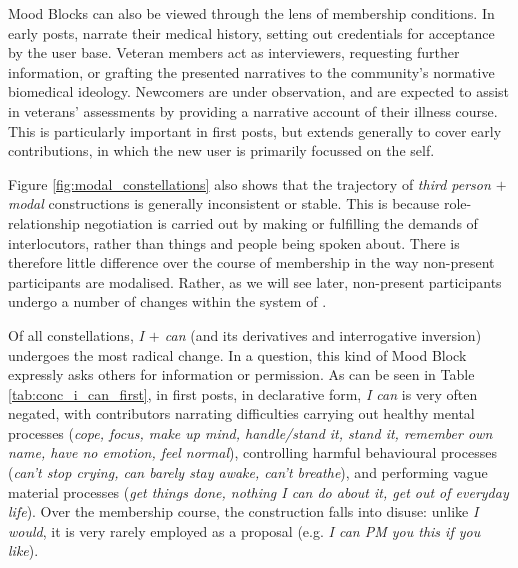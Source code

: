 Mood Blocks can also be viewed through the lens of  membership conditions. In early \glspl{post},  narrate their medical history, setting out credentials for acceptance by the user base. Veteran \glspl{member} act as interviewers, requesting further information, or grafting the presented narratives to the community's normative biomedical ideology. Newcomers are under observation, and are expected to assist in veterans' assessments by providing a narrative account of their illness course. This is particularly important in first \glspl{post}, but extends generally to cover early contributions, in which the new user is primarily focussed on the self.

Figure \ref{fig:modal_constellations} also shows that the trajectory of \emph{third person $+$ modal} constructions is generally inconsistent or stable. This is because role\hyp{}relationship negotiation is carried out by making or fulfilling the demands of interlocutors, rather than things and people being spoken about. There is therefore little difference over the course of membership in the way non\hyp{}present participants are modalised. Rather, as we will see later, non\hyp{}present participants undergo a number of changes within the system of .

Of all constellations, \emph{I $+$ can} (and its derivatives and interrogative inversion) undergoes the most radical change. In a question, this kind of Mood Block expressly asks others for information or permission. As can be seen in Table \ref{tab:conc_i_can_first}, in first \glspl{post}, in declarative form, \emph{I can} is very often negated, with contributors narrating difficulties carrying out healthy mental processes (\emph{cope, focus, make up mind, handle\slash stand it, stand it, remember own name, have no emotion, feel normal}), controlling harmful behavioural processes (\emph{can't stop crying, can barely stay awake, can't breathe}), and performing vague material processes (\emph{get things done, nothing I can do about it, get out of everyday life}). Over the membership course, the construction falls into disuse: unlike \emph{I would}, it is very rarely employed as a proposal (e.g. \emph{I can PM you this if you like}).

